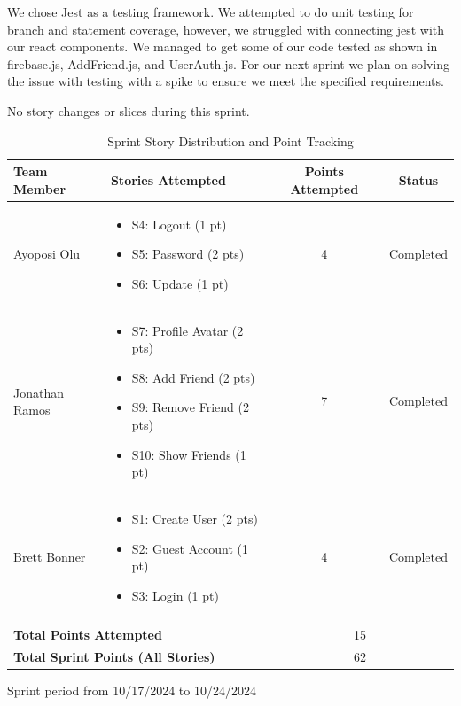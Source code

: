 \documentclass[12pt]{article} %
\begin{document}
    We chose Jest as a testing framework. We attempted to do unit testing for branch and statement coverage, however, we struggled with connecting jest with our react components. We managed to get some of our code tested as shown in firebase.js, AddFriend.js, and UserAuth.js. For our next sprint we plan on solving the issue with testing with a spike to ensure we meet the specified requirements. 

\begin{table}[h]
\centering
No story changes or slices during this sprint.

\caption{Sprint Story Distribution and Point Tracking}
\begin{tabular}{|p{3cm}|p{6cm}|c|c|}
\hline
\textbf{Team Member} & \textbf{Stories Attempted} & \textbf{Points Attempted} & \textbf{Status} \\
\hline
Ayoposi Olu & 
\begin{itemize}
    \item S4: Logout (1 pt)
    \item S5: Password (2 pts)
    \item S6: Update (1 pt)
\end{itemize} & 
4 & 
Completed \\
\hline
Jonathan Ramos & 
\begin{itemize}
    \item S7: Profile Avatar (2 pts)
    \item S8: Add Friend (2 pts)
    \item S9: Remove Friend (2 pts)
    \item S10: Show Friends (1 pt)
\end{itemize}& 
7 & 
Completed \\
\hline
Brett Bonner & 
\begin{itemize}
    \item S1: Create User (2 pts)
    \item S2: Guest Account (1 pt)
    \item S3: Login (1 pt)
\end{itemize} & 
4 & 
Completed \\
\hline
\multicolumn{4}{|c|}{} \\
\hline
\multicolumn{2}{|l|}{\textbf{Total Points Attempted}} & \multicolumn{2}{c|}{15} \\
\hline
\multicolumn{2}{|l|}{\textbf{Total Sprint Points (All Stories)}} & \multicolumn{2}{c|}{62} \\
\hline
\end{tabular}

\vspace{0.5cm}
\begin{center}
\small{Sprint period from 10/17/2024 to 10/24/2024}
\end{center}
\end{table}
\end{document}
